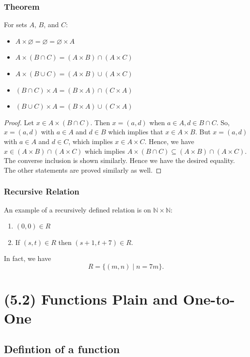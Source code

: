 \documentclass[11pt]{article}
\let\emptyset\varnothing
\begin{document}
        \subsubsection{Theorem}
        For sets $A$, $B$, and $C$:
        \begin{itemize}
            \item \(A \times \emptyset = \emptyset = \emptyset \times A\)
            \item \(A \times (B \cap C) = (A \times B) \cap (A \times C)\)
            \item \(A \times (B \cup C) = (A \times B) \cup (A \times C)\)
            \item \((B \cap C) \times A = (B \times A) \cap (C \times A)\)
            \item \((B \cup C) \times A = (B \times A) \cup (C \times A)\)
        \end{itemize}
        \begin{proof}
            Let \(x \in A \times (B \cap C)\). Then \(x = (a,d)\) when \(a \in A, d \in B \cap C\). So, \(x = (a,d)\) with \(a \in A\) and \(d \in B\) which implies that \(x \in A \times B.\) But \(x = (a,d)\) with \(a \in A\) and \(d \in C\), which implies \(x \in A \times C\). Hence, we have \(x \in (A \times B) \cap (A \times C)\) which implies \(A \times (B \cap C) \subseteq (A \times B) \cap (A \times C).\) The converse inclusion is shown similarly. Hence we have the desired equality. The other statements are proved similarly as well.
        \end{proof}

        \subsubsection{Recursive Relation}
        An example of a recursively defined relation is on \(\mathbb{N} \times \mathbb{N}\):
        \begin{enumerate}
            \item \((0,0) \in R\)
            \item If \((s,t) \in R\) then \((s+1, t+7) \in R\).
        \end{enumerate}
        In fact, we have \[R = \{(m,n) \mid n = 7m\}.\]

        
    \section{(5.2) Functions Plain and One-to-One}

        \subsection{Defintion of a function}
\end{document}

